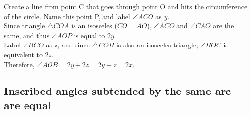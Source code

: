 \documentclass{article}
\begin{document}
\begin{minipage}{.2\linewidth}
\end{minipage}
\hfill
\begin{minipage}{.6\linewidth}

Create a line from point C that goes through point O and hits the circumference of the circle. Name this point P, and label \(\angle ACO\) as \(y\).\\
Since triangle \(\triangle COA\) is an isosceles (\(CO=AO\)), \(\angle ACO\) and \(\angle CAO\) are the same, and thus \(\angle AOP\) is equal to \(2y\).\\
Label \(\angle BCO\) as \(z\), and since \(\triangle COB\) is also an isosceles triangle, \(\angle BOC\) is equivalent to \(2z\).\\
Therefore, \(\angle AOB=2y+2z=2y+z=2x\). 

\end{minipage}



\pagebreak

\subsection{Inscribed angles subtended by the same arc are equal}
\end{document}
